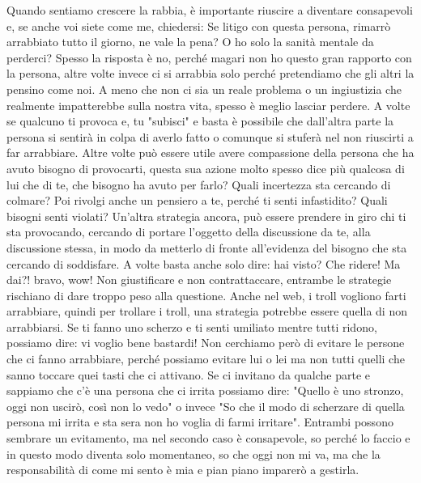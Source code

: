 \documentclass[12pt]{book} %
\begin{document}
Quando sentiamo crescere la rabbia, è importante riuscire a diventare consapevoli e, se anche voi siete come me, chiedersi:
Se litigo con questa persona, rimarrò arrabbiato tutto il giorno, ne vale la pena? O ho solo la sanità mentale da perderci?
Spesso la risposta è no, perché magari non ho questo gran rapporto con la persona, altre volte invece ci si arrabbia solo perché pretendiamo che gli altri la pensino come noi. A meno che non ci sia un reale problema o un ingiustizia che realmente impatterebbe sulla nostra vita, spesso è meglio lasciar perdere. 
A volte se qualcuno ti provoca e, tu "subisci" e basta è possibile che dall'altra parte la persona si sentirà in colpa di averlo fatto o comunque si stuferà nel non riuscirti a far arrabbiare. Altre volte può essere utile avere compassione della persona che ha avuto bisogno di provocarti, questa sua azione molto spesso dice più qualcosa di lui che di te, che bisogno ha avuto per farlo? Quali incertezza sta cercando di colmare? Poi rivolgi anche un pensiero a te, perché ti senti infastidito? Quali bisogni senti violati?
Un'altra strategia ancora, può essere prendere in giro chi ti sta provocando, cercando di portare l'oggetto della discussione da te, alla discussione stessa, in modo da metterlo di fronte all'evidenza del bisogno che sta cercando di soddisfare. A volte basta anche solo dire: \newline
hai visto? Che ridere! \newline
Ma dai?! bravo, wow! \newline
Non giustificare e non contrattaccare, entrambe le strategie rischiano di dare troppo peso alla questione.
Anche nel web, i troll vogliono farti arrabbiare, quindi per trollare i troll, una strategia potrebbe essere quella di non arrabbiarsi.
Se ti fanno uno scherzo e ti senti umiliato mentre tutti ridono, possiamo dire: vi voglio bene bastardi!
Non cerchiamo però di evitare le persone che ci fanno arrabbiare, perché possiamo evitare lui o lei ma non tutti quelli che sanno toccare quei tasti che ci attivano. Se ci invitano da qualche parte e sappiamo che c'è una persona che ci irrita possiamo dire: "Quello è uno stronzo, oggi non uscirò, così non lo vedo" o invece "So che il modo di scherzare di quella persona mi irrita e sta sera non ho voglia di farmi irritare". Entrambi possono sembrare un evitamento, ma nel secondo caso è consapevole, so perché lo faccio e in questo modo diventa solo momentaneo, so che oggi non mi va, ma che la responsabilità di come mi sento è mia e pian piano imparerò a gestirla.
\end{document}
